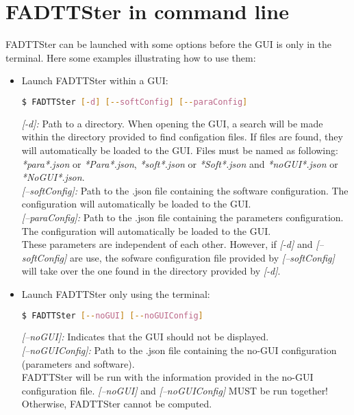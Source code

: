 \documentclass[fadttsterUserGuide_master]{subfiles}
\begin{document}
	\section{FADTTSter in command line}
	FADTTSter can be launched with some options before the GUI is only in the terminal. Here some examples illustrating how to use them:
	\begin{itemize}
		\item Launch FADTTSter within a GUI:
		\begin{lstlisting}[language=bash]
$ FADTTSter [-d] [--softConfig] [--paraConfig]
		\end{lstlisting}
		\textit{[-d]:} Path to a directory. When opening the GUI, a search will be made within the directory provided to find configation files. If files are found, they will automatically be loaded to the GUI. Files must be named as following: \textit{*para*.json} or \textit{*Para*.json}, \textit{*soft*.json} or \textit{*Soft*.json} and \textit{*noGUI*.json} or \textit{*NoGUI*.json}.\\
		\textit{[--softConfig]:} Path to the .json file containing the software configuration. The configuration will automatically be loaded to the GUI.\\
		\textit{[--paraConfig]:} Path to the .json file containing the parameters configuration. The configuration will automatically be loaded to the GUI.\\
		
		These parameters are independent of each other. However, if \textit{[-d]} and \textit{[--softConfig]} are use, the sofware configuration file provided by \textit{[--softConfig]} will take over the one found in the directory provided by \textit{[-d]}.
		
		\item Launch FADTTSter only using the terminal:
		\begin{lstlisting}[language=bash]
$ FADTTSter [--noGUI] [--noGUIConfig]
		\end{lstlisting}
		\textit{[--noGUI]:} Indicates that the GUI should not be displayed.\\
		\textit{[--noGUIConfig]:}  Path to the .json file containing the no-GUI configuration (parameters and software).\\
		
		FADTTSter will be run with the information provided in the no-GUI configuration file. \textit{[--noGUI]} and \textit{[--noGUIConfig]} MUST be run together! Otherwise, FADTTSter cannot be computed.
	\end{itemize}
\end{document}
